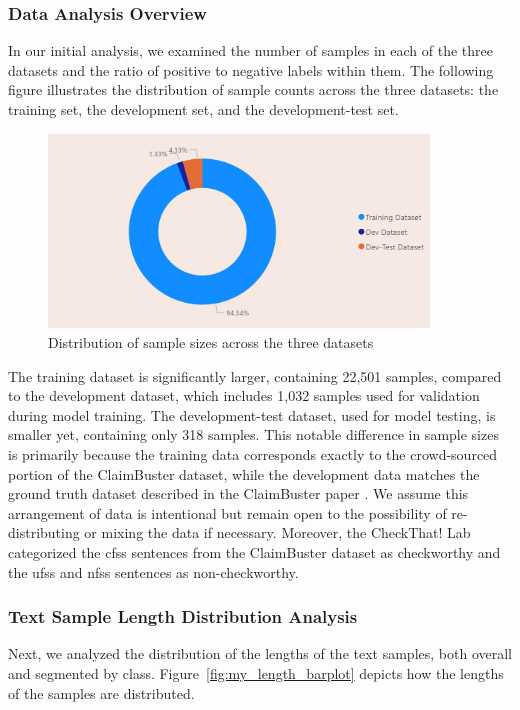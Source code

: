 \subsubsection{Data Analysis Overview}
In our initial analysis, we examined the number of samples in each of the three datasets and the ratio of positive to negative labels within them. The following figure illustrates the distribution of sample counts across the three datasets: the training set, the development set, and the development-test set.

\begin{figure}[h]
    \centering
    \includegraphics[width=0.9\textwidth]{assets/Sample_Distribution.jpg}
    \caption{Distribution of sample sizes across the three datasets}
    \label{fig:my_label}
\end{figure}

The training dataset is significantly larger, containing 22,501 samples, compared to the development dataset, which includes 1,032 samples used for validation during model training. The development-test dataset, used for model testing, is smaller yet, containing only 318 samples. This notable difference in sample sizes is primarily because the training data corresponds exactly to the crowd-sourced portion of the ClaimBuster dataset, while the development data matches the ground truth dataset described in the ClaimBuster paper \cite{claimbuster_arslan}. We assume this arrangement of data is intentional but remain open to the possibility of re-distributing or mixing the data if necessary. Moreover, the CheckThat! Lab categorized the \glspl{cfs} sentences from the ClaimBuster dataset as checkworthy and the \glspl{ufs} and \glspl{nfs} sentences as non-checkworthy.

\subsubsection{Text Sample Length Distribution Analysis}
Next, we analyzed the distribution of the lengths of the text samples, both overall and segmented by class. Figure~\ref{fig:my_length_barplot} depicts how the lengths of the samples are distributed.

